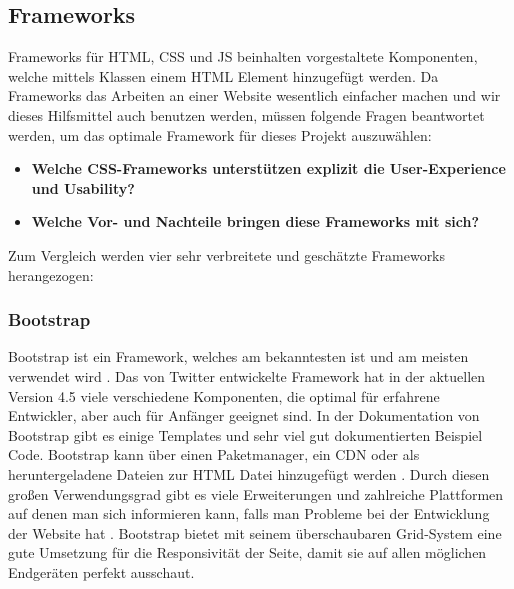 	
	
	\subsection{Frameworks}
	Frameworks für HTML, CSS und JS beinhalten vorgestaltete Komponenten, welche mittels Klassen einem HTML Element hinzugefügt werden. Da Frameworks das Arbeiten an einer Website wesentlich einfacher machen und wir dieses Hilfsmittel auch benutzen werden, müssen folgende Fragen beantwortet werden, um das optimale Framework für dieses Projekt auszuwählen:
	\begin{itemize}
		\item \textbf{Welche CSS-Frameworks unterstützen explizit die User-Experience und Usability?}
		\item \textbf{Welche Vor- und Nachteile bringen diese Frameworks mit sich?}
	\end{itemize}
	Zum Vergleich werden vier sehr verbreitete und geschätzte Frameworks herangezogen:
		\subsubsection{Bootstrap}
		Bootstrap ist ein Framework, welches am bekanntesten ist und am meisten verwendet wird \cite{introduction-bootstrap, learning-bootstrap}. Das von Twitter entwickelte Framework hat in der aktuellen Version 4.5 viele verschiedene Komponenten, die optimal für erfahrene Entwickler, aber auch für Anfänger geeignet sind. In der Dokumentation von Bootstrap gibt es einige Templates und sehr viel gut dokumentierten Beispiel Code\cite{introduction-bootstrap}. Bootstrap kann über einen Paketmanager, ein CDN oder als heruntergeladene Dateien zur HTML Datei hinzugefügt werden \cite{bootstrap-docu}. Durch diesen großen Verwendungsgrad gibt es viele Erweiterungen und zahlreiche Plattformen auf denen man sich informieren kann, falls man Probleme bei der Entwicklung der Website hat \cite{learning-bootstrap}. Bootstrap bietet mit seinem überschaubaren Grid-System eine gute Umsetzung für die Responsivität der Seite, damit sie auf allen möglichen Endgeräten perfekt ausschaut.
